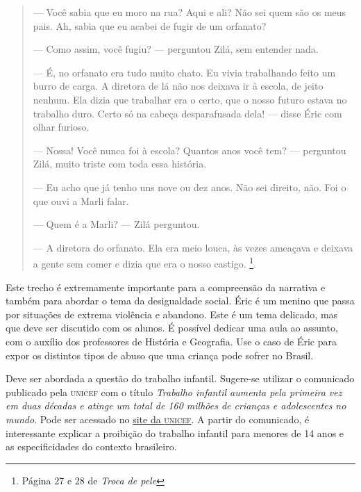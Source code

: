 \documentclass[11pt]{extarticle}
\begin{document}
\begin{quote}
— Você sabia que eu moro na rua? Aqui e ali? Não sei quem são os meus pais. Ah, sabia que eu acabei de fugir de um orfanato?

— Como assim, você fugiu? — perguntou Zilá, sem entender nada.

— É, no orfanato era tudo muito chato. Eu vivia trabalhando feito um burro de carga. A diretora de lá não nos deixava ir à escola, de jeito nenhum. Ela dizia que trabalhar era o certo, que o nosso futuro estava no trabalho duro. Certo só na cabeça desparafusada dela! — disse Éric com olhar furioso. 

— Nossa! Você nunca foi à escola? Quantos anos você tem? — perguntou Zilá, muito triste com toda essa história.

— Eu acho que já tenho uns nove ou dez anos. Não sei direito, não. Foi o que ouvi a Marli falar.

— Quem é a Marli? — Zilá perguntou.

— A diretora do orfanato. Ela era meio louca, às vezes ameaçava e deixava a gente sem comer e dizia que era o nosso castigo.
\footnote{Página 27 e 28 de \textit{Troca de pele}}.

\end{quote}

Este trecho é extremamente importante para a compreensão da narrativa e também para abordar o tema da desigualdade social. Éric é um menino que passa por situações de extrema violência e abandono. Este é um tema delicado, mas que deve ser discutido com os alunos. É possível dedicar uma aula ao assunto, com o auxílio dos professores de História e Geografia. Use o caso de Éric para expor os distintos tipos de abuso que uma criança pode sofrer no Brasil. 


Deve ser abordada a questão do trabalho infantil. Sugere-se utilizar o comunicado publicado pela \textsc{unicef} com o título \textit{Trabalho infantil aumenta pela primeira vez em duas décadas e atinge um total de 160 milhões de crianças e adolescentes no mundo}. Pode ser acessado no \href{https://www.unicef.org/brazil/comunicados-de-imprensa/trabalho-infantil-aumenta-pela-primeira-vez-em-duas-decadas-e-atinge-um-total-de-160-milhoes-de-criancas-e-adolescentes-no-mundo}{site da \textsc{unicef}}. A partir do comunicado, é interessante explicar a proibição do trabalho infantil para menores de 14 anos e as especificidades do contexto brasileiro.
\end{document}
